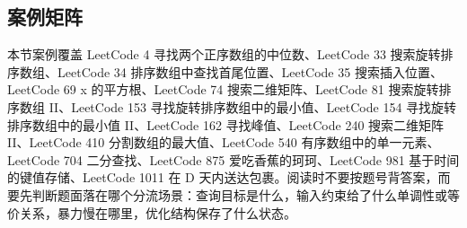 \subsection{案例矩阵}

本节案例覆盖 LeetCode 4 寻找两个正序数组的中位数、LeetCode 33 搜索旋转排序数组、LeetCode 34 排序数组中查找首尾位置、LeetCode 35 搜索插入位置、LeetCode 69 x 的平方根、LeetCode 74 搜索二维矩阵、LeetCode 81 搜索旋转排序数组 II、LeetCode 153 寻找旋转排序数组中的最小值、LeetCode 154 寻找旋转排序数组中的最小值 II、LeetCode 162 寻找峰值、LeetCode 240 搜索二维矩阵 II、LeetCode 410 分割数组的最大值、LeetCode 540 有序数组中的单一元素、LeetCode 704 二分查找、LeetCode 875 爱吃香蕉的珂珂、LeetCode 981 基于时间的键值存储、LeetCode 1011 在 D 天内送达包裹。阅读时不要按题号背答案，而要先判断题面落在哪个分流场景：查询目标是什么，输入约束给了什么单调性或等价关系，暴力慢在哪里，优化结构保存了什么状态。

